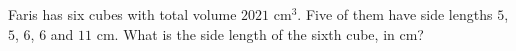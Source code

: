 Faris has six cubes with total volume $2021$ cm$^3$. Five of them have side lengths $5$, $5$, $6$, $6$ and $11$ cm. What is the side length of the sixth cube, in cm?
